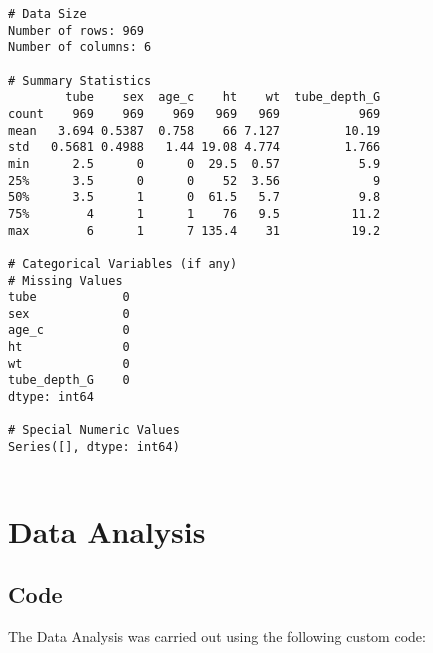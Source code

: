 \documentclass[11pt]{article}
\begin{document}
\begin{Verbatim}[tabsize=4]
# Data Size
Number of rows: 969
Number of columns: 6

# Summary Statistics
        tube    sex  age_c    ht    wt  tube_depth_G
count    969    969    969   969   969           969
mean   3.694 0.5387  0.758    66 7.127         10.19
std   0.5681 0.4988   1.44 19.08 4.774         1.766
min      2.5      0      0  29.5  0.57           5.9
25%      3.5      0      0    52  3.56             9
50%      3.5      1      0  61.5   5.7           9.8
75%        4      1      1    76   9.5          11.2
max        6      1      7 135.4    31          19.2

# Categorical Variables (if any)
# Missing Values
tube            0
sex             0
age_c           0
ht              0
wt              0
tube_depth_G    0
dtype: int64

# Special Numeric Values
Series([], dtype: int64)


\end{Verbatim}

\section{Data Analysis}
\subsection{{Code}}
The Data Analysis was carried out using the following custom code:
\end{document}
